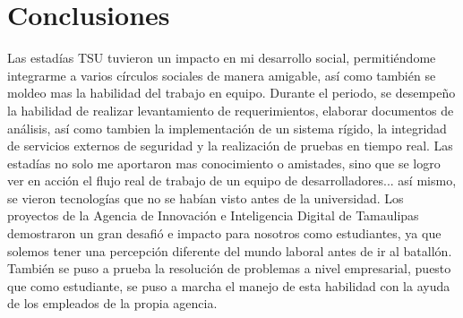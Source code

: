 \documentclass[12pt]{article}
\begin{document}
\section{Conclusiones}
Las estadías TSU tuvieron un impacto en mi desarrollo social, permitiéndome integrarme
a varios círculos sociales de manera amigable, así como también se moldeo mas la habilidad
del trabajo en equipo. Durante el periodo, se desempeño la habilidad de realizar levantamiento
de requerimientos, elaborar documentos de análisis, así como tambien la implementación de un sistema
rígido, la integridad de servicios externos de seguridad y la realización de pruebas en tiempo
real. Las estadías no solo me aportaron mas conocimiento o amistades, sino que se logro ver en
acción el flujo real de trabajo de un equipo de desarrolladores... así mismo, se vieron tecnologías
que no se habían visto antes de la universidad. Los proyectos de la Agencia de Innovación e
Inteligencia Digital de Tamaulipas demostraron un gran desafió e impacto para nosotros como
estudiantes, ya que solemos tener una percepción diferente del mundo laboral antes de ir al
batallón. También se puso a prueba la resolución de problemas a nivel empresarial, puesto que
como estudiante, se puso a marcha el manejo de esta habilidad con la ayuda de los empleados
de la propia agencia.




\clearpage
{} 
\printbibliography


\clearpage
{} 


\thispagestyle{fancy}


\clearpage
\thispagestyle{fancy}


\end{document}
